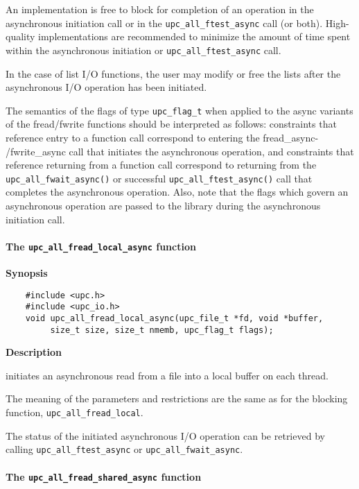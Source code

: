 \np An implementation is free to block for completion of an operation in the
asynchronous initiation call or in the {\tt upc\_all\_ftest\_async} call (or both).
High-quality implementations are recommended to minimize the amount of time
spent within the asynchronous initiation or {\tt upc\_all\_ftest\_async} call.

\np In the case of list I/O functions, the user may modify or free the lists
after the asynchronous I/O operation has been initiated.

\np The semantics of the flags of type {\tt upc\_flag\_t} when applied
    to the async variants of the fread/fwrite functions should be
    interpreted as follows: constraints that reference entry to a
    function call correspond to entering the fread\_async-
    /fwrite\_async call that initiates the asynchronous operation, and
    constraints that reference returning from a function call
    correspond to returning from the {\tt upc\_all\_fwait\_async()} or
    successful {\tt upc\_all\_ftest\_async()} call that completes the
    asynchronous operation. Also, note that the flags
    which govern an asynchronous operation are passed to the library
    during the asynchronous initiation call.

\paragraph{The {\tt upc\_all\_fread\_local\_async} function}

{\bf Synopsis}

\npf\vspace{-2.5em}
\begin{verbatim}
    #include <upc.h>
    #include <upc_io.h> 
    void upc_all_fread_local_async(upc_file_t *fd, void *buffer,
         size_t size, size_t nmemb, upc_flag_t flags);
\end{verbatim}

{\bf Description}

 initiates an asynchronous read from a file
into a local buffer on each thread.

\np The meaning of the parameters and restrictions are the same as for the
blocking function, {\tt upc\_all\_fread\_local}.

\np The status of the initiated asynchronous I/O operation can be retrieved by calling
{\tt upc\_all\_ftest\_async} or {\tt upc\_all\_fwait\_async}.

\paragraph{The {\tt upc\_all\_fread\_shared\_async} function}

